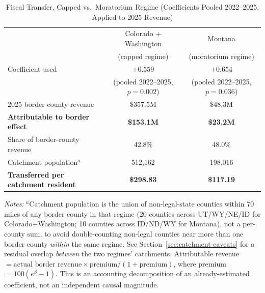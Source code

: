 \begin{table}[htbp]
\centering
\caption{Fiscal Transfer, Capped vs.\ Moratorium Regime (Coefficients Pooled 2022--2025, Applied to 2025 Revenue)}
\label{tab:magnitude1}
\small
\begin{tabular}{lcc}
\toprule
& Colorado + Washington & Montana \\
& (capped regime) & (moratorium regime) \\
\midrule
Coefficient used & $+0.559$ & $+0.654$ \\
& (pooled 2022--2025, $p=0.002$) & (pooled 2022--2025, $p=0.036$) \\
2025 border-county revenue & \$357.5M & \$48.3M \\
\textbf{Attributable to border effect} & \textbf{\$153.1M} & \textbf{\$23.2M} \\
Share of border-county revenue & 42.8\% & 48.0\% \\
Catchment population$^{a}$ & 512{,}162 & 198{,}016 \\
\textbf{Transferred per catchment resident} & \textbf{\$298.83} & \textbf{\$117.19} \\
\bottomrule
\end{tabular}
\begin{minipage}{0.95\textwidth}
\vspace{0.3em}
\footnotesize
\textit{Notes:} $^{a}$Catchment population is the union of non-legal-state counties within 70 miles of any
border county in that regime (20 counties across UT/WY/NE/ID for Colorado+Washington; 10 counties across
ID/ND/WY for Montana), not a per-county sum, to avoid double-counting non-legal counties near more than
one border county \emph{within} the same regime. See Section~\ref{sec:catchment-caveats} for a residual
overlap \emph{between} the two regimes' catchments. Attributable revenue $= \text{actual border revenue}
\times \text{premium}/(1+\text{premium})$, where premium $=100(e^{\beta}-1)$. This is an accounting
decomposition of an already-estimated coefficient, not an independent causal magnitude.
\end{minipage}
\end{table}
